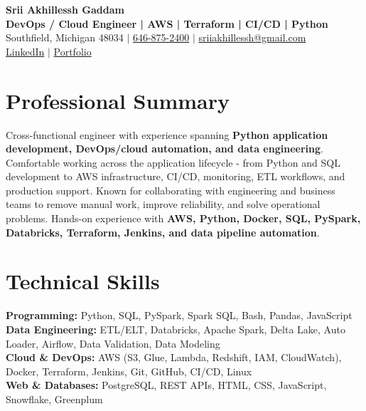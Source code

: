 \documentclass[letterpaper,10pt]{article}
\begin{document}
\fontsize{9.35pt}{10.45pt}\selectfont

\begin{center}
    {\LARGE \textbf{Srii Akhillessh Gaddam}} \\[-1pt]
    \textbf{DevOps / Cloud Engineer | AWS | Terraform | CI/CD | Python} \\[2pt]
    Southfield, Michigan 48034 $|$
    \href{tel:6468752400}{646-875-2400} $|$
    \href{mailto:sriiakhillessh@gmail.com}{sriiakhillessh@gmail.com} \\[1pt]
    \href{https://www.linkedin.com/in/srii-akhiilessh-gaddam-b48668191/}{LinkedIn} $|$
    \href{https://sriiakhillesshg.github.io/portfolio/}{Portfolio}
\end{center}
\vspace{-8pt}

\section{Professional Summary}
\small{Cross-functional engineer with experience spanning \textbf{Python application development, DevOps/cloud automation, and data engineering}. Comfortable working across the application lifecycle - from Python and SQL development to AWS infrastructure, CI/CD, monitoring, ETL workflows, and production support. Known for collaborating with engineering and business teams to remove manual work, improve reliability, and solve operational problems. Hands-on experience with \textbf{AWS, Python, Docker, SQL, PySpark, Databricks, Terraform, Jenkins, and data pipeline automation}.}

\section{Technical Skills}
\small{
\textbf{Programming:} Python, SQL, PySpark, Spark SQL, Bash, Pandas, JavaScript \\
\textbf{Data Engineering:} ETL/ELT, Databricks, Apache Spark, Delta Lake, Auto Loader, Airflow, Data Validation, Data Modeling \\
\textbf{Cloud \& DevOps:} AWS (S3, Glue, Lambda, Redshift, IAM, CloudWatch), Docker, Terraform, Jenkins, Git, GitHub, CI/CD, Linux \\
\textbf{Web \& Databases:} PostgreSQL, REST APIs, HTML, CSS, JavaScript, Snowflake, Greenplum
}
\end{document}
